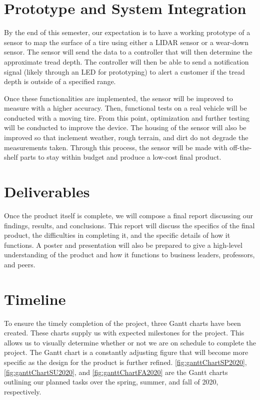 \documentclass[11pt]{IEEEtran}
\begin{document}
	\section{Prototype and System Integration}
		By the end of this semester, our expectation is to have a working prototype of a sensor to map the surface of a tire using either a LIDAR sensor or a wear-down sensor. The sensor will send the data to a controller that will then determine the approximate tread depth. The controller will then be able to send a notification signal (likely through an LED for prototyping) to alert a customer if the tread depth is outside of a specified range.

		Once these functionalities are implemented, the sensor will be improved to measure with a higher accuracy. Then, functional tests on a real vehicle will be conducted with a moving tire. From this point, optimization and further testing will be conducted to improve the device. The housing of the sensor will also be improved so that inclement weather, rough terrain, and dirt do not degrade the measurements taken. Through this process, the sensor will be made with off-the-shelf parts to stay within budget and produce a low-cost final product.

	\section{Deliverables}
		Once the product itself is complete, we will compose a final report discussing our findings, results, and conclusions. This report will discuss the specifics of the final product, the difficulties in completing it, and the specific details of how it functions. A poster and presentation will also be prepared to give a high-level understanding of the product and how it functions to business leaders, professors, and peers.

	\section{Timeline}
		To ensure the timely completion of the project, three Gantt charts have been created. These charts supply us with expected milestones for the project. This allows us to visually determine whether or not we are on schedule to complete the project. The Gantt chart is a constantly adjusting figure that will become more specific as the design for the product is further refined. \autoref{fig:ganttChartSP2020}, \autoref{fig:ganttChartSU2020}, and \autoref{fig:ganttChartFA2020} are the Gantt charts outlining our planned tasks over the spring, summer, and fall of 2020, respectively.
\end{document}
